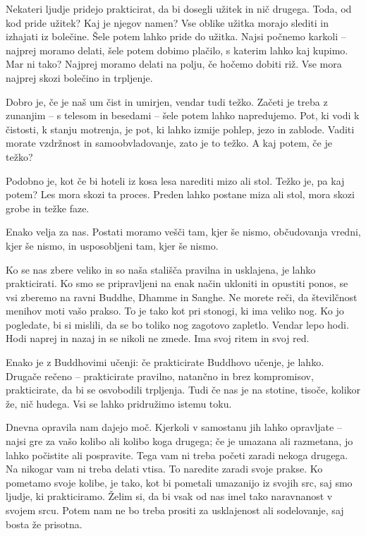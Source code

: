 \clearpage


Nekateri ljudje pridejo prakticirat, da bi dosegli užitek in nič drugega. Toda, od kod pride užitek? Kaj je njegov namen? Vse oblike užitka morajo slediti in izhajati iz bolečine. Šele potem lahko pride do užitka. Najsi počnemo karkoli – najprej moramo delati, šele potem dobimo plačilo, s katerim lahko kaj kupimo. Mar ni tako? Najprej moramo delati na polju, če hočemo dobiti riž. Vse mora najprej skozi bolečino in trpljenje.

\vspace{-\baselineskip}

Dobro je, če je naš um čist in umirjen, vendar tudi težko. Začeti je treba z zunanjim – s telesom in besedami – šele potem lahko napredujemo. Pot, ki vodi k čistosti, k stanju motrenja, je pot, ki lahko izmije pohlep, jezo in zablode. Vaditi morate vzdržnost in samoobvladovanje, zato je to težko. A kaj potem, če je težko?

Podobno je, kot če bi hoteli iz kosa lesa narediti mizo ali stol. Težko je, pa kaj potem? Les mora skozi ta proces. Preden lahko postane miza ali stol, mora skozi grobe in težke faze.

Enako velja za nas. Postati moramo vešči tam, kjer še nismo, občudovanja vredni, kjer še nismo, in usposobljeni tam, kjer še nismo.

\clearpage


Ko se nas zbere veliko in so naša stališča pravilna in usklajena, je lahko prakticirati. Ko smo se pripravljeni na enak način ukloniti in opustiti ponos, se vsi zberemo na ravni Buddhe, Dhamme in Sanghe. Ne morete reči, da številčnost menihov moti vašo prakso. To je tako kot pri stonogi, ki ima veliko nog. Ko jo pogledate, bi si mislili, da se bo toliko nog zagotovo zapletlo. Vendar lepo hodi. Hodi naprej in nazaj in se nikoli ne zmede. Ima svoj ritem in svoj red.

Enako je z Buddhovimi učenji: če prakticirate Buddhovo učenje, je lahko. Drugače rečeno – prakticirate pravilno, natančno in brez kompromisov, prakticirate, da bi se osvobodili trpljenja. Tudi če nas je na stotine, tisoče, kolikor že, nič hudega. Vsi se lahko pridružimo istemu toku.

\clearpage


Dnevna opravila nam dajejo moč. Kjerkoli v samostanu jih lahko opravljate – najsi gre za vašo kolibo ali kolibo koga drugega; če je umazana ali razmetana, jo lahko počistite ali pospravite. Tega vam ni treba početi zaradi nekoga drugega. Na nikogar vam ni treba delati vtisa. To naredite zaradi svoje prakse. Ko pometamo svoje kolibe, je tako, kot bi pometali umazanijo iz svojih src, saj smo ljudje, ki prakticiramo. Želim si, da bi vsak od nas imel tako naravnanost v svojem srcu. Potem nam ne bo treba prositi za usklajenost ali sodelovanje, saj bosta že prisotna.

